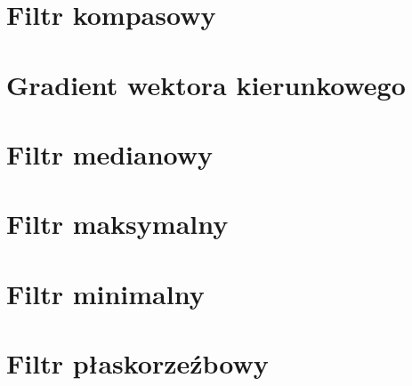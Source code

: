 \documentclass[a4paper,12pt]{book}
\begin{document}
	\section{Filtr kompasowy}
	\section{Gradient wektora kierunkowego}
	\section{Filtr medianowy}
	\section{Filtr maksymalny}
	\section{Filtr minimalny}
	\section{Filtr płaskorzeźbowy}
\end{document}
